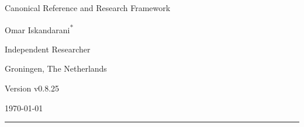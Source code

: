 \documentclass[11pt]{article}
\theoremstyle{definition}
\theoremstyle{plain}
\theoremstyle{remark}
\begin{document}
    
    \thispagestyle{empty}

    \begin{center}
        \vspace*{0.06\textheight}

        {\LARGE\bfseries \papertitle\par}
        \vspace{0.45cm}

        {\large Canonical Reference and Research Framework\par}
        \vspace{1.0cm}

        {\Large Omar Iskandarani\textsuperscript{*}\par}
        \vspace{0.35cm}

        {\normalsize Independent Researcher\par}
        {\normalsize Groningen, The Netherlands\par}
        \vspace{0.6cm}

        {\normalsize Version v0.8.25\par}
        {\normalsize \today\par}
        \vspace{0.9cm}

        \rule{0.82\textwidth}{0.5pt}
        \vspace{0.7cm}
    \end{center}

    \begin{abstract}
        \noindent
        This document presents Swirl-String Theory (SST) as a structured canonical synthesis rather than as a claim that every phenomenological sector has already been derived to theorem level. The text records the impedance--resonance and free-to-bound-mode origin of the programme; consolidates the primitive constant chain linking the effective fluid density, characteristic swirl speed, Compton anchoring, and horn/circulation scale; assigns a minimal relational link-field action as the microscopic research candidate beneath the continuum torsion bridge; records the operational special-relativity postulate that stable vortex matter constructs local spacetime with clocks, rods, and luminal R-phase torsion pulses; and organizes delay selection, atomic bridges, spectroscopy, knot-geometry certification, KAM-caged dynamical stability, relational time, and topology-based mass within one explicitly stratified framework. Throughout, historical provenance, calibrated identities, SST-internal derivations, predictions, and conjectural extensions are kept distinct so that the canon remains internally coherent, externally comparable, and open to falsification.
    \end{abstract}
\end{document}
